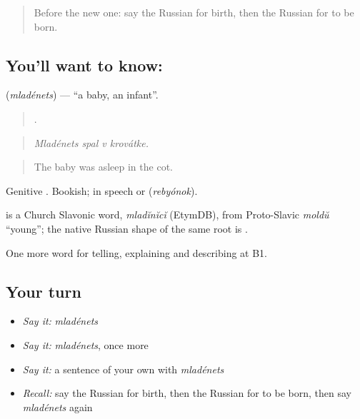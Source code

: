 \label{lesson:RU-C303-mladenets}



\begin{quote}
Before the new one: say the Russian for birth, then the Russian for to be born.
\end{quote}

\subsection*{You'll want to know: }
\textbf{} (\emph{mladénets}) — \textquotedblleft{}a baby, an infant\textquotedblright{}.

\begin{quote}
   .
\end{quote}

\begin{quote}
\emph{Mladénets spal v krovátke.}
\end{quote}

\begin{quote}
The baby was asleep in the cot.
\end{quote}

Genitive \emph{}. Bookish; in speech \emph{} or \emph{} (\emph{rebyónok}).

\begin{cousinweb}
\emph{} is a Church Slavonic word, \emph{mladĭnĭcĭ} (EtymDB), from Proto-Slavic \emph{moldŭ} \textquotedblleft{}young\textquotedblright{}; the native Russian shape of the same root is \emph{}.
\end{cousinweb}

\begin{grammarlens}[title={What you've built}]
One more word for telling, explaining and describing at B1.
\end{grammarlens}

\subsection*{Your turn}
\begin{itemize}
\raggedright
  \item \emph{Say it:} \emph{mladénets}
  \item \emph{Say it:} \emph{mladénets}, once more
  \item \emph{Say it:} a sentence of your own with \emph{mladénets}
  \item \emph{Recall:} say the Russian for birth, then the Russian for to be born, then say \emph{mladénets} again
\end{itemize}

